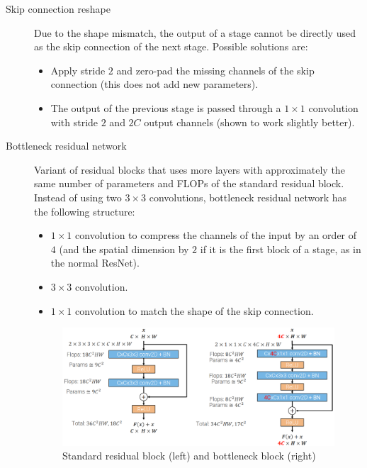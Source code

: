 \begin{description}
    \item[Skip connection reshape]
        Due to the shape mismatch, the output of a stage cannot be directly used as the skip connection of the next stage.
        Possible solutions are:
        \begin{itemize}
            \item Apply stride $2$ and zero-pad the missing channels of the skip connection (this does not add new parameters).
            \item The output of the previous stage is passed through a $1 \times 1$ convolution with stride $2$ and $2C$ output channels (shown to work slightly better).
        \end{itemize}

    \item[Bottleneck residual network] 
        Variant of residual blocks that uses more layers with approximately the same number of parameters and FLOPs of the standard residual block.
        Instead of using two $3 \times 3$ convolutions, bottleneck residual network has the following structure:
        \begin{itemize}
            \item $1 \times 1$ convolution to compress the channels of the input by an order of $4$ (and the spatial dimension by $2$ if it is the first block of a stage, as in the normal ResNet).
            \item $3 \times 3$ convolution.
            \item $1 \times 1$ convolution to match the shape of the skip connection.
        \end{itemize}

        \begin{figure}[H]
            \centering
            \includegraphics[width=0.7\linewidth]{./img/bottleneck_block.png}
            \caption{Standard residual block (left) and bottleneck block (right)}
        \end{figure}
\end{description}

